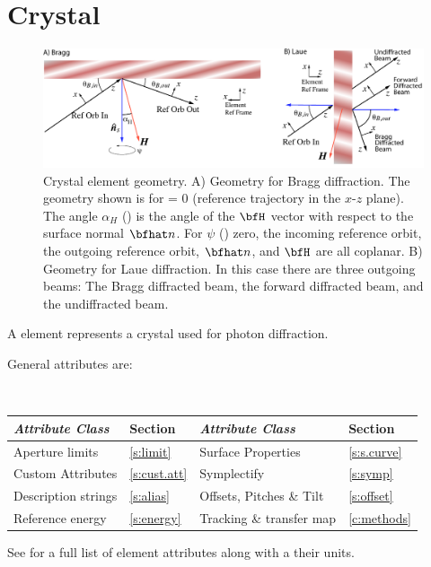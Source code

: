 \section{Crystal}
\label{s:crystal}

\begin{figure}[tb]
  \centering
  \includegraphics[width=5in]{crystal-ele.pdf}
  \caption[Crystal element geometry.]
{Crystal element geometry.  A) Geometry for Bragg diffraction. The geometry shown is for
 = 0 (reference trajectory in the $x$-$z$ plane). The angle $\alpha_H$
() is the angle of the $\bfH$ vector with respect to the surface normal $\bfhat
n$. For $\psi$ () zero, the incoming reference orbit, the outgoing reference orbit,
$\bfhat n$, and $\bfH$ are all coplanar. B) Geometry for Laue diffraction. In this case there are
three outgoing beams: The Bragg diffracted beam, the forward diffracted beam, and the undiffracted
beam.}
  \label{f:crystal}
\end{figure}

A  element represents a crystal used for photon diffraction.

General  attributes are:
\begin{center}
\tt
\begin{tabular}{llll} \toprule
  {\sl Attribute Class}      & Section          & {\sl Attribute Class}      & Section         \\ \midrule
  Aperture limits            & \ref{s:limit}    & Surface Properties         & \ref{s:s.curve} \\ 
  Custom Attributes          & \ref{s:cust.att} & Symplectify                & \ref{s:symp}    \\
  Description strings        & \ref{s:alias}    & Offsets, Pitches \& Tilt   & \ref{s:offset}  \\
  Reference energy           & \ref{s:energy}   & Tracking \& transfer map   & \ref{c:methods} \\
  \bottomrule
\end{tabular}
\end{center}
\toffset
See  for a full list of element attributes along with a their units.

